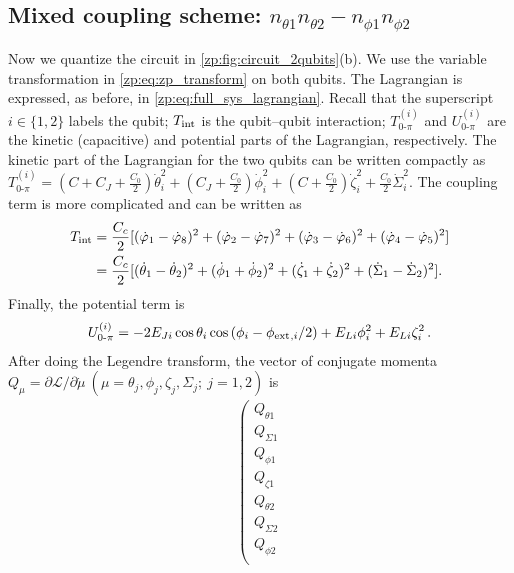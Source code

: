 \begin{widetext}
\subsection{ Mixed coupling scheme: \texorpdfstring{$ n_{\theta1}n_{\theta2} - n_{\phi1}n_{\phi2} $}{theta + phi}}\label{zp:app:coupling_scheme_mix}
Now we quantize the circuit in \cref{zp:fig:circuit_2qubits}(b).
We use the variable transformation in \cref{zp:eq:zp_transform} on both \zps qubits.
The Lagrangian is expressed, as before, in \cref{zp:eq:full_sys_lagrangian}.
Recall that the superscript $i\in\{1,2\}$ labels the qubit; $T_{\rm int}$ is the qubit–qubit interaction; $T_{0\text{-}\pi}^{(i)}$ and $U_{0\text{-}\pi}^{(i)}$ are the kinetic (capacitive) and potential parts of the Lagrangian, respectively.
The kinetic part of the Lagrangian for the two \zps qubits can be written compactly as
$T_{0\text{-}\pi}^{(i)}
= ( C+C_J+\frac{C_0}{2} ) \dot{\theta}_i^2 +  (C_J+\frac{C_0}{2}) \dot{\phi}_i^2 + ( C+\frac{C_0}{2} ) \dot{\zeta}_i^2 +\frac{C_0}{2} \dot{\Sigma}_i^2$.
The coupling term is more complicated and can be written as
\begin{align}
T_{\rm int}&=\frac{C_{c}}{2}
[(\dot{\varphi }_1-\dot{\varphi }_8){}^2 +
(\dot{\varphi }_2-\dot{\varphi }_7){}^2
+ (\dot{\varphi }_3-\dot{\varphi }_6){}^2 +
(\dot{\varphi }_4-\dot{\varphi }_5){}^2]     \nonumber
\\
&=\frac{C_{c}}{2}
[(\dot{\theta }_1 - \dot{\theta }_2){}^2 +
(\dot{\phi }_1 + \dot{\phi }_2){}^2
+ (\dot{\zeta }_1 + \dot{\zeta }_2){}^2 +
(\dot{\Sigma }_1 - \dot{\Sigma }_2){}^2].
\end{align}
Finally, the potential term is
\begin{align}
U_{0\text{-}\pi}^{(i)} = -2E_{Ji} \cos{\theta_i} \cos{(\phi_i-\phi_{\rm ext}{}_{,i}/2)} + E_{Li}\phi_i^2 + E_{Li} \zeta_i^2 \, .
\end{align}
After doing the Legendre transform, the vector of conjugate momenta $Q_\mu=\partial\mathcal{L}/\partial\dot{\mu}\ (\mu=\theta_j,\phi_j,\zeta_j,\Sigma_j;\ j=1,2)$ is
\begin{align} \label{zp:eq:capacitance_mat_2}
\left(\begin{array}{c}
Q_{\theta 1} \\
Q_{\Sigma 1} \\
Q_{\phi 1} \\
Q_{\zeta 1} \\
Q_{\theta 2} \\
Q_{\Sigma 2} \\
Q_{\phi 2} \\

\end{array}
\end{align}
\end{widetext}
